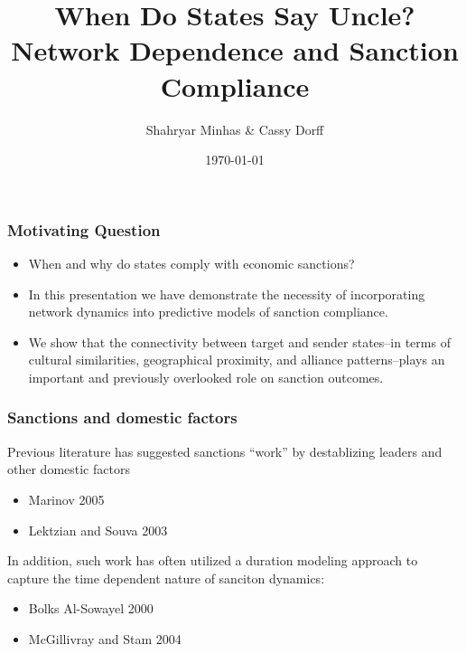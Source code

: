 \documentclass{beamer}
\title[When Do States Say Uncle? \hspace{14em} \insertframenumber/
\inserttotalframenumber]{When Do States Say Uncle? Network Dependence and Sanction Compliance}
\author{Shahryar Minhas \& Cassy Dorff}
\institute[Duke University]
{
{\emph{shahryar.minhas@duke.edu \& cassy.dorff@duke.edu}} \\
\medskip
Duke University 
}
\date{\today}
\begin{document}
\begin{frame}
\titlepage
\end{frame}

\begin{frame}
\frametitle{Motivating Question}

\begin{itemize}
	\item When and why do states comply with economic sanctions? 
	\item In this presentation we have demonstrate the necessity of incorporating network dynamics into predictive models of sanction compliance. 
	\item We show that the connectivity between target and sender states--in terms of cultural similarities, geographical proximity, and alliance patterns--plays an important and previously overlooked role on sanction outcomes. 
\end{itemize}

\end{frame}

\begin{frame}
\frametitle{Sanctions and domestic factors}
Previous literature has suggested sanctions ``work'' by destablizing leaders and other domestic factors
\begin{itemize}
\item Marinov 2005
\item Lektzian and Souva 2003
\end{itemize}

In addition, such work has often utilized a duration modeling approach to capture the time dependent nature of sanciton dynamics: 
\begin{itemize}
\item Bolks Al-Sowayel 2000
\item McGillivray and Stam 2004
\end{itemize}


\end{frame}
\end{document}

